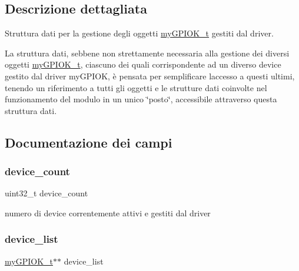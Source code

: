 \subsection{Descrizione dettagliata}
Struttura dati per la gestione degli oggetti \hyperlink{structmy_g_p_i_o_k__t}{my\+G\+P\+I\+O\+K\+\_\+t} gestiti dal driver. 

La struttura dati, sebbene non strettamente necessaria alla gestione dei diversi oggetti \hyperlink{structmy_g_p_i_o_k__t}{my\+G\+P\+I\+O\+K\+\_\+t}, ciascuno dei quali corrispondente ad un diverso device gestito dal driver my\+G\+P\+I\+OK, è pensata per semplificare l\textquotesingle{}accesso a questi ultimi, tenendo un riferimento a tutti gli oggetti e le strutture dati coinvolte nel funzionamento del modulo in un unico \char`\"{}posto\char`\"{}, accessibile attraverso questa struttura dati. 

\subsection{Documentazione dei campi}
\mbox{\label{structmy_g_p_i_o_k__list__t_a170d1d78f27f6ab4c8badaaa4b3f2305}} 
\subsubsection{\texorpdfstring{device\+\_\+count}{device\_count}}
{\footnotesize\ttfamily uint32\+\_\+t device\+\_\+count}

numero di device correntemente attivi e gestiti dal driver \mbox{\label{structmy_g_p_i_o_k__list__t_a99b54fb4cab6e0b7ea3bd94415bbcca0}} 
\subsubsection{\texorpdfstring{device\+\_\+list}{device\_list}}
{\footnotesize\ttfamily \hyperlink{structmy_g_p_i_o_k__t}{my\+G\+P\+I\+O\+K\+\_\+t}$\ast$$\ast$ device\+\_\+list}

